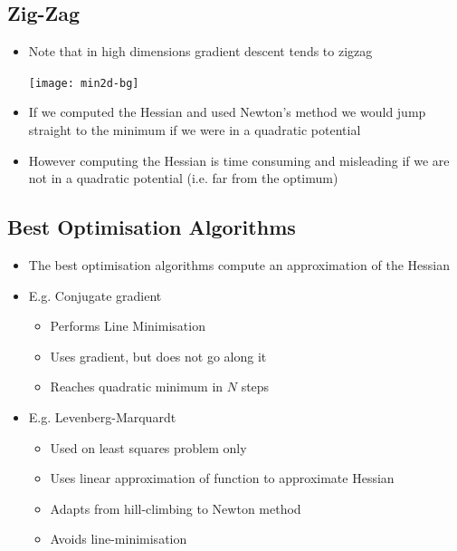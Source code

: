 \begin{slide}
\section[-2]{Zig-Zag}

\begin{PauseHighLight}
  \begin{itemize}
  \item Note that in high dimensions gradient descent tends to zigzag
    \begin{center}
      \texttt{[image: min2d-bg]}\pause
      \pause
    \end{center}
  \item If we computed the Hessian and used Newton's method we would
    jump straight to the minimum if we were in a quadratic potential\pause
  \item However computing the Hessian is time consuming and misleading
    if we are not in a quadratic potential (i.e. far from the optimum)\pause
  \end{itemize}
\end{PauseHighLight}

\end{slide}



\begin{slide}
\section[-1]{Best Optimisation Algorithms}

\begin{PauseHighLight}

\begin{itemize}
\item The best optimisation algorithms compute an approximation of the
  Hessian\pause
\item E.g. Conjugate gradient\pause
  \begin{itemize}\squeeze
  \item Performs Line Minimisation\pause
  \item Uses gradient, but does not go along it\pause
  \item Reaches quadratic minimum in $N$ steps\pause
  \end{itemize}
\item E.g. Levenberg-Marquardt\pause
  \begin{itemize}\squeeze
  \item Used on least squares problem only\pause
  \item Uses linear approximation of function to approximate Hessian\pause
  \item Adapts from hill-climbing to Newton method\pause
  \item Avoids line-minimisation\pause
  \end{itemize}
\end{itemize}

\end{PauseHighLight}
\end{slide}

